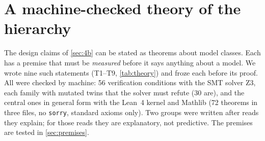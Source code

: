 \documentclass[10pt,twocolumn]{article}
\theoremstyle{remark}
\begin{document}
\section{A machine-checked theory of the hierarchy}\label{sec:theory}
The design claims of \cref{sec:4b} can be stated as theorems about model classes. Each has a premise that must be \emph{measured}
before it says anything about a model. We wrote nine such statements (T1--T9, \cref{tab:theory}) and froze each before its proof.
All were checked by machine: 56 verification conditions with the SMT solver Z3, each family with mutated twins that the solver must
refute (30 are), and the central ones in general form with the Lean~4 kernel and Mathlib (72 theorems in three files, no \texttt{sorry}, standard
axioms only). Two groups were written after reads they explain; for those reads they are explanatory, not predictive. The premises
are tested in \cref{sec:premises}.
\end{document}
